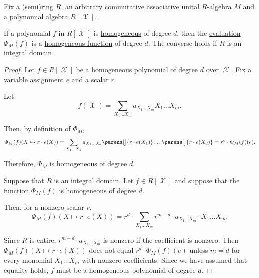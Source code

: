 \begin{proposition}\label{thm:homogeneous_polynomial_iff_homogeneous_function}
  Fix a \hyperref[def:semiring]{(semi)ring} \( R \), an arbitrary \hyperref[def:algebra_over_semiring/commutative]{commutative associative unital \( R \)-algebra} \( M \) and a \hyperref[def:polynomial_algebra]{polynomial algebra} \( R[\mscrX] \).

  If a polynomial \( f \) in \( R[\mscrX] \) is \hyperref[def:homogeneous_polynomial]{homogeneous} of degree \( d \), then the \hyperref[con:free_construction/evaluation]{evaluation} \( \Phi_M(f) \) is a \hyperref[def:homogeneous_function]{homogeneous function} of degree \( d \). The converse holds if \( R \) is an \hyperref[def:integral_domain]{integral domain}.
\end{proposition}
\begin{proof}
  \SufficiencySubProof Let \( f \in R[\mscrX] \) be a homogeneous polynomial of degree \( d \) over \( \mscrX \). Fix a variable assignment \( e \) and a scalar \( r \).

  Let
  \begin{equation*}
    f(\mscrX) = \sum_{X_1 \ldots X_m} a_{X_1 \ldots X_m} X_1 \ldots X_m.
  \end{equation*}

  Then, by definition of \( \Phi_M \),
  \begin{equation*}
    \Phi_M(f)(X \mapsto r \cdot e(X))
    =
    \sum_{X_1 \ldots X_d} a_{X_1 \ldots X_d} \parens[\big]{ r \cdot e(X_1) } \ldots \parens[\big]{ r \cdot e(X_d) }
    =
    r^d \cdot \Phi_M(f)(e).
  \end{equation*}

  Therefore, \( \Phi_M \) is homogeneous of degree \( d \).

  \NecessitySubProof Suppose that \( R \) is an integral domain. Let \( f \in R[\mscrX] \) and suppose that the function \( \Phi_M(f) \) is homogeneous of degree \( d \).

  Then, for a nonzero scalar \( r \),
  \begin{equation*}
    \Phi_M(f)(X \mapsto r \cdot e(X))
    =
    r^d \cdot \sum_{X_1 \ldots X_m} r^{m - d} \cdot a_{X_1 \ldots X_m} \cdot X_1 \ldots X_m.
  \end{equation*}

  Since \( R \) is entire, \( r^{m - d} \cdot a_{X_1 \ldots X_m} \) is nonzero if the coefficient is nonzero. Then \( \Phi_M(f)(X \mapsto r \cdot e(X)) \) does not equal \( r^d \cdot \Phi_M(f)(e) \) unless \( m = d \) for every monomial \( X_1 \ldots X_m \) with nonzero coefficients. Since we have assumed that equality holds, \( f \) must be a homogeneous polynomial of degree \( d \).
\end{proof}

